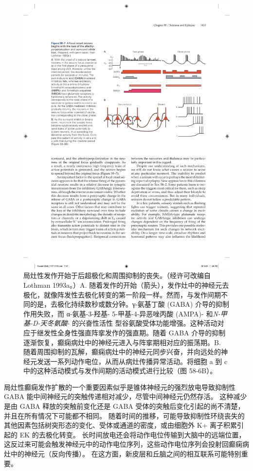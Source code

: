 \begin{figure}[htbp]
	\centering
	\includegraphics[width=0.7\linewidth]{chap58/fig_58_7}
	\caption{局灶性发作开始于后超极化和周围抑制的丧失。（经许可改编自 Lothman 1993a。）A. 随着发作的开始（箭头），发作灶中的神经元去极化，就像阵发性去极化转变的第一阶段一样。然而，与发作间期不同的是，去极化持续数秒或数分钟。γ-氨基丁酸 (GABA) 介导的抑制作用失败，而 α-氨基-3-羟基- 5-甲基-4-异恶唑丙酸 (AMPA)- 和\textit{N-甲基-D-天冬氨酸}- 的兴奋性活性 型谷氨酸受体功能增强。这种活动对应于继发性全身性强直阵挛发作的强直期。随着 GABA 介导的抑制逐渐恢复，癫痫病灶中的神经元进入与阵挛期相对应的振荡期。B. 随着周围抑制的瓦解，癫痫病灶中的神经元同步兴奋，并向远处的神经元发送一系列动作电位，从而从病灶传播异常活动。将细胞 a 到 c 中的这种活动模式与发作间期的活动模式进行比较（图 58-6B）。}
	\label{fig:58_7}
\end{figure}


局灶性癫痫发作扩散的一个重要因素似乎是锥体神经元的强烈放电导致抑制性 GABA 能中间神经元的突触传递相对减少，尽管中间神经元仍然存活。
这种减少是由 GABA 释放的突触前变化还是 GABA 受体的突触后变化引起的尚不清楚，并且在所有情况下可能都不相同。
随着时间的推移，可能导致抑制性环绕丧失的其他因素包括树突形态的变化、受体或通道的密度，或由细胞外 K+ 离子积累引起的 EK 的去极化转变。
长时间放电还会将动作电位传输到大脑中的远端位置，这反过来可能会触发神经元中的动作电位序列，这些动作电位序列会投射回癫痫病灶中的神经元（反向传播）。
在这方面，新皮层和丘脑之间的相互联系可能特别重要。


